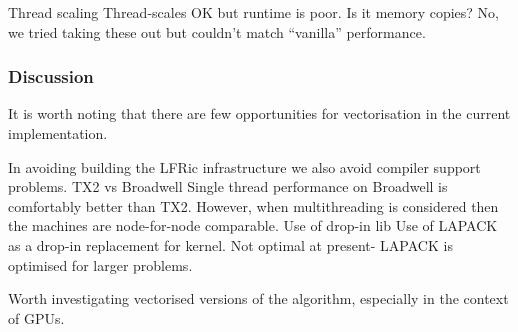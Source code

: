 Thread scaling
Thread-scales OK but runtime is poor.
Is it memory copies? No, we tried taking these out but couldn't match ``vanilla'' performance.

\subsubsection{Discussion}

It is worth noting that there are few opportunities for vectorisation in the current implementation.

In avoiding building the LFRic infrastructure we also avoid compiler support problems.
TX2 vs Broadwell
Single thread performance on Broadwell is comfortably better than TX2. However, when multithreading is considered then the machines are node-for-node comparable.
Use of drop-in lib
Use of LAPACK as a drop-in replacement for kernel. Not optimal at present- LAPACK is optimised for larger problems.

Worth investigating vectorised versions of the algorithm, especially in the context of GPUs.
